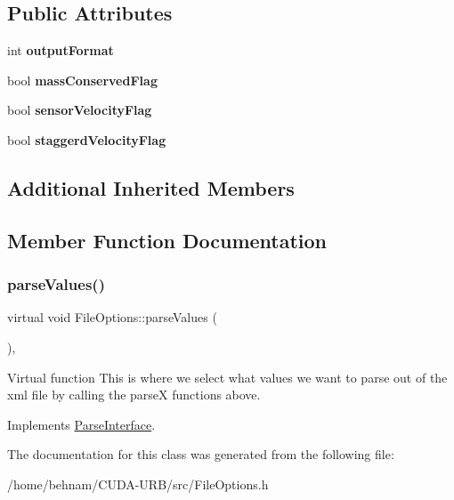 \subsection*{Public Attributes}
\begin{DoxyCompactItemize}
\item 
\mbox{\label{classFileOptions_a8b18bf8ae9f804ac81ca8b87e0f52c7a}} 
int {\bfseries output\+Format}
\item 
\mbox{\label{classFileOptions_aa016071f4f488afc701c2ac87f21aefb}} 
bool {\bfseries mass\+Conserved\+Flag}
\item 
\mbox{\label{classFileOptions_abe6b2ae12234d7976ee42b8b03721a95}} 
bool {\bfseries sensor\+Velocity\+Flag}
\item 
\mbox{\label{classFileOptions_af3e20b4b957b31526d8f0fcb0e506ad8}} 
bool {\bfseries staggerd\+Velocity\+Flag}
\end{DoxyCompactItemize}
\subsection*{Additional Inherited Members}


\subsection{Member Function Documentation}
\mbox{\label{classFileOptions_aca2f6304ed7d1fdde5c6c392d7fd11b9}} 
\subsubsection{\texorpdfstring{parse\+Values()}{parseValues()}}
{\footnotesize\ttfamily virtual void File\+Options\+::parse\+Values (\begin{DoxyParamCaption}{ }\end{DoxyParamCaption})\hspace{0.3cm}{\ttfamily [inline]}, {\ttfamily [virtual]}}

Virtual function This is where we select what values we want to parse out of the xml file by calling the parseX functions above. 

Implements \hyperlink{classParseInterface_afca32108192ba0997c9e5a78189b0cbc}{Parse\+Interface}.



The documentation for this class was generated from the following file\+:\begin{DoxyCompactItemize}
\item 
/home/behnam/\+C\+U\+D\+A-\/\+U\+R\+B/src/File\+Options.\+h\end{DoxyCompactItemize}
